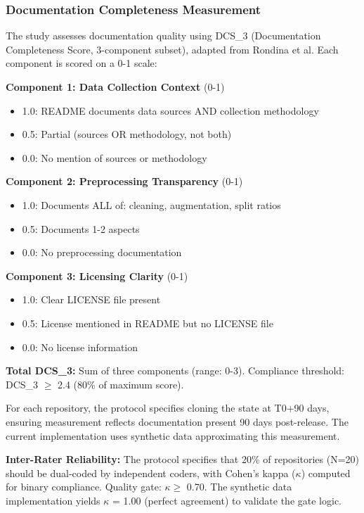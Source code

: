 \subsubsection{Documentation Completeness Measurement}

The study assesses documentation quality using DCS\_3 (Documentation Completeness Score, 3-component subset), adapted from Rondina et al. Each component is scored on a 0-1 scale:

\textbf{Component 1: Data Collection Context} (0-1)  
\begin{itemize}
\item 1.0: README documents data sources AND collection methodology
\item 0.5: Partial (sources OR methodology, not both)
\item 0.0: No mention of sources or methodology
\end{itemize}

\textbf{Component 2: Preprocessing Transparency} (0-1)  
\begin{itemize}
\item 1.0: Documents ALL of: cleaning, augmentation, split ratios
\item 0.5: Documents 1-2 aspects
\item 0.0: No preprocessing documentation
\end{itemize}

\textbf{Component 3: Licensing Clarity} (0-1)  
\begin{itemize}
\item 1.0: Clear LICENSE file present
\item 0.5: License mentioned in README but no LICENSE file
\item 0.0: No license information
\end{itemize}

\textbf{Total DCS\_3:} Sum of three components (range: 0-3). Compliance threshold: DCS\_3 $\geq$ 2.4 (80\% of maximum score).

For each repository, the protocol specifies cloning the state at T0+90 days, ensuring measurement reflects documentation present 90 days post-release. The current implementation uses synthetic data approximating this measurement.

\textbf{Inter-Rater Reliability:} The protocol specifies that 20\% of repositories (N=20) should be dual-coded by independent coders, with Cohen's kappa ($\kappa$) computed for binary compliance. Quality gate: $\kappa \geq$ 0.70. The synthetic data implementation yields $\kappa$ = 1.00 (perfect agreement) to validate the gate logic.


